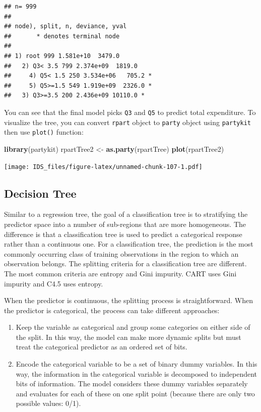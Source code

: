 \documentclass[12pt,]{krantz}
\makeatletter
\newenvironment{Shaded}{\begin{snugshade}}{\end{snugshade}}
\newcommand{\KeywordTok}[1]{\textcolor[rgb]{0.27,0.27,0.27}{\textbf{#1}}}
\newcommand{\NormalTok}[1]{#1}
\newcommand{\StringTok}[1]{\textcolor[rgb]{0.5,0.5,0.5}{#1}}
\providecommand{\tightlist}{%
  \setlength{\itemsep}{0pt}\setlength{\parskip}{0pt}}
\newenvironment{kframe}{%
\medskip{}
\setlength{\fboxsep}{.8em}
 \def\at@end@of@kframe{}%
 \ifinner\ifhmode%
  \def\at@end@of@kframe{\end{minipage}}%
  \begin{minipage}{\columnwidth}%
 \fi\fi%
 \def\FrameCommand##1{\hskip\@totalleftmargin \hskip-\fboxsep
 \colorbox{shadecolor}{##1}\hskip-\fboxsep
     \hskip-\linewidth \hskip-\@totalleftmargin \hskip\columnwidth}%
 \MakeFramed {\advance\hsize-\width
   \@totalleftmargin\z@ \linewidth\hsize
   \@setminipage}}%
 {\par\unskip\endMakeFramed%
 \at@end@of@kframe}
\renewenvironment{Shaded}{\begin{kframe}}{\end{kframe}}
\makeatother
\begin{document}
\begin{verbatim}
## n= 999 
## 
## node), split, n, deviance, yval
##       * denotes terminal node
## 
## 1) root 999 1.581e+10  3479.0  
##   2) Q3< 3.5 799 2.374e+09  1819.0  
##     4) Q5< 1.5 250 3.534e+06   705.2 *
##     5) Q5>=1.5 549 1.919e+09  2326.0 *
##   3) Q3>=3.5 200 2.436e+09 10110.0 *
\end{verbatim}

You can see that the final model picks \texttt{Q3} and \texttt{Q5} to predict total expenditure. To visualize the tree, you can convert \texttt{rpart} object to \texttt{party} object using \texttt{partykit} then use \texttt{plot()} function:

\begin{Shaded}
\begin{Highlighting}[]
\KeywordTok{library}\NormalTok{(partykit)}
\NormalTok{rpartTree2 <-}\StringTok{ }\KeywordTok{as.party}\NormalTok{(rpartTree)}
\KeywordTok{plot}\NormalTok{(rpartTree2)}
\end{Highlighting}
\end{Shaded}

\texttt{[image: IDS\_files/figure-latex/unnamed-chunk-107-1.pdf]}

\hypertarget{decision-tree}{%
\subsection{Decision Tree}\label{decision-tree}}

Similar to a regression tree, the goal of a classification tree is to stratifying the predictor space into a number of sub-regions that are more homogeneous. The difference is that a classification tree is used to predict a categorical response rather than a continuous one. For a classification tree, the prediction is the most commonly occurring class of training observations in the region to which an observation belongs. The splitting criteria for a classification tree are different. The most common criteria are entropy and Gini impurity. CART uses Gini impurity and C4.5 uses entropy.

When the predictor is continuous, the splitting process is straightforward. When the predictor is categorical, the process can take different approaches:

\begin{enumerate}
\def\labelenumi{\arabic{enumi}.}
\tightlist
\item
  Keep the variable as categorical and group some categories on either side of the split. In this way, the model can make more dynamic splits but must treat the categorical predictor as an ordered set of bits.
\item
  Encode the categorical variable to be a set of binary dummy variables. In this way, the information in the categorical variable is decomposed to independent bits of information. The model considers these dummy variables separately and evaluates for each of these on one split point (because there are only two possible values: 0/1).
\end{enumerate}
\end{document}
